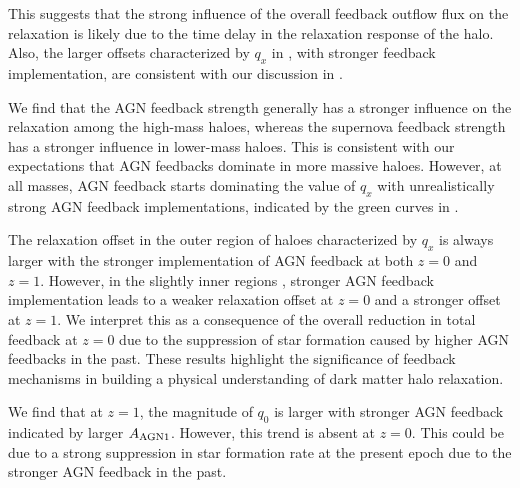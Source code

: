 This suggests that the strong influence of the overall feedback outflow flux on the relaxation is likely due to the time delay in the relaxation response of the halo.  Also, the larger offsets characterized by $q_x$ in , with stronger feedback implementation, are consistent with our discussion in . 

We find that the AGN feedback strength generally has a stronger influence on the relaxation among the high-mass haloes, whereas the supernova feedback strength has a stronger influence in lower-mass haloes. This is consistent with our expectations that AGN feedbacks dominate in more massive haloes. However, at all masses, AGN feedback starts dominating the value of $q_x$ with unrealistically  strong AGN feedback implementations, indicated by the green curves in .

The relaxation offset in the outer region of haloes characterized by $q_x$ is always larger with the stronger implementation of AGN feedback at both \( z=0 \) and \( z=1 \). However, in the slightly inner regions , stronger AGN feedback implementation leads to a weaker relaxation offset at \( z=0 \) and a stronger offset at \( z=1 \).  We interpret this as a consequence of the overall reduction in total feedback at \( z=0 \) due to the suppression of star formation caused by higher AGN feedbacks in the past. These results highlight the significance of feedback mechanisms in building a physical understanding of dark matter halo relaxation.

We find that at $z=1$, the magnitude of $q_0$ is larger with stronger AGN feedback indicated by larger $A_{\rm{AGN1}}$. However, this trend is absent at $z=0$. This could be due to a strong suppression in star formation rate at the present epoch due to the stronger AGN feedback in the past. 









